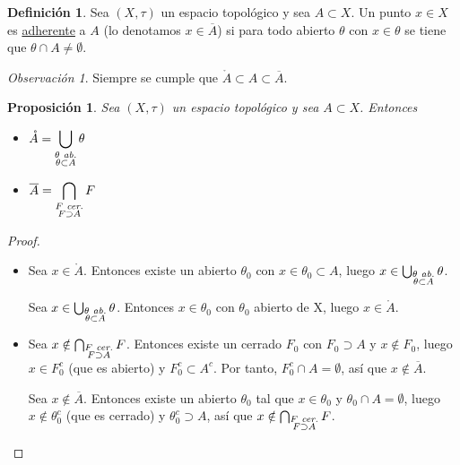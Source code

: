 \documentclass[12pt]{report}
\newtheorem{proposition}{Proposición}[chapter]
\theoremstyle{definition}
\newtheorem{definition}{Definición}[chapter]
\theoremstyle{definition}
\theoremstyle{remark}
\newtheorem*{obs}{Observación} %
\begin{document}
\begin{definition}
Sea $(X,\tau)$ un espacio topológico y sea $A \subset X$. Un punto $x \in X$ es \underline{adherente} a $A$ (lo denotamos $x \in \overline{A}$) si para todo abierto $\theta$ con $x \in \theta$ se tiene que $\theta \cap A \neq \emptyset$.
\end{definition}

\begin{obs}
Siempre se cumple que $\mathring{A} \subset A \subset \overline{A}$.
\end{obs}

\begin{proposition}
Sea $(X,\tau)$ un espacio topológico y sea $A \subset X$. Entonces
\begin{itemize}
    \item[(i)]
    $
        \begin{aligned}[t]
            \mathring{A} = \bigcup_{\substack{\theta \emph{ ab.} \\ \theta \subset A}}\theta
        \end{aligned}    
    $    
    \item[(ii)]
    $
        \begin{aligned}[t]
            \overline{A} = \bigcap_{\substack{F \emph{ cer.} \\ F \supset A}}F
        \end{aligned}    
    $    
\end{itemize}
\end{proposition}

\begin{proof}
\hfill
\begin{itemize}
    \item[(i)] \fbox[rb]{$\subset$} Sea $x \in \mathring{A}$. Entonces existe un abierto $\theta_0$ con $x \in \theta_0 \subset A$, luego $x \in \bigcup_{\substack{\theta \emph{ ab.} \\ \theta \subset A}}\theta$.
    
    \fbox[rb]{$\supset$} Sea $x \in \bigcup_{\substack{\theta \emph{ ab.} \\ \theta \subset A}}\theta$. Entonces $x \in \theta_0$ con $\theta_0$ abierto de X, luego $x \in \mathring{A}$.
    \item[(ii)] \fbox[rb]{$\subset$} Sea $x \notin \bigcap_{\substack{F \emph{ cer.} \\ F \supset A}}F$. Entonces existe un cerrado $F_0$ con $F_0 \supset A$ y $x \notin F_0$, luego $x \in F_0^c$ (que es abierto) y $\displaystyle F_0^c \subset A^c$. Por tanto, $\displaystyle F_0^c \cap A = \emptyset$, así que $x \notin \overline{A}$.
    
    \fbox[rb]{$\supset$} Sea $x \notin \overline{A}$. Entonces existe un abierto $\theta_0$ tal que $\displaystyle x \in \theta_0$ y $\theta_0 \cap A = \emptyset$, luego $\displaystyle x \notin \theta_0^c$ (que es cerrado) y $\displaystyle \theta_0^c \supset A$, así que $x \notin \bigcap_{\substack{F \emph{ cer.} \\ F \supset A}}F$.
\end{itemize}
\end{proof}
\end{document}
